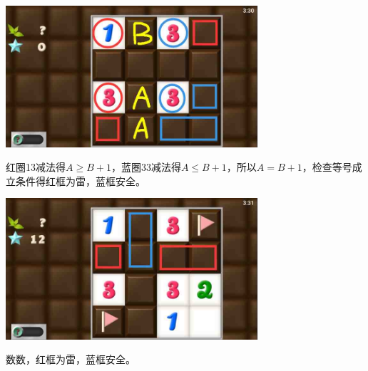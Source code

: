 \subsection{} %
\begin{center}
    \includegraphics[width=0.7\textwidth]{puzzlelow/158-1.jpg}
\end{center}
红圈13减法得$A\ge B+1$，蓝圈33减法得$A\le B+1$，所以$A=B+1$，检查等号成立条件得红框为雷，蓝框安全。
\begin{center}
    \includegraphics[width=0.7\textwidth]{puzzlelow/158-2.jpg}
\end{center}
数数，红框为雷，蓝框安全。

